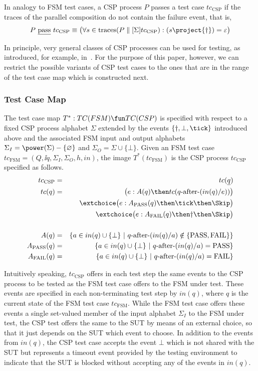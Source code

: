  In analogy to FSM test cases, a CSP process $P$ passes a test case $tc_\text{CSP}$
 if the traces of the parallel composition do not contain the failure event, that is,
 $$
 P\ \pass\ tc_\text{CSP} \equiv \big(
 \forall s\in\trc(P\parallel[\Sigma] tc_\text{CSP}): (s\project \{\dag\}) = \varepsilon
 \big)
 $$


 In principle, very general classes of CSP processes can be
 used for testing, as introduced, for example,
 in~\cite{DBLP:conf/fm/PeleskaS96,peleska1997a}. For the purpose of this paper, however, we can restrict the possible variants of CSP test cases to the ones that are in the range of the test case map which is constructed next.


\subsubsection*{Test Case Map}

The test case map $T^* :TC(FSM) \fun TC(CSP)$ is specified with respect to a fixed
CSP process alphabet $\Sigma$ extended by the events $\{\dag,\bot,\tick \}$ introduced
above
and the associated FSM input and output alphabets
$\Sigma_I = \power(\Sigma)-\{\varnothing\}$ and $\Sigma_O=\Sigma\cup \{\bot \}$.
Given an FSM test case $tc_\text{FSM}=(Q,\ii q,\Sigma_I,\Sigma_O,h,in)$,
the image $T^*(tc_\text{FSM})$ is the CSP process $tc_\text{CSP}$ specified
as follows.
\begin{eqnarray*}
tc_\text{CSP} & = & tc(\ii q)
\\
tc(q) & = & \big( e :  A(q) \then  tc(q\after (in(q)/e)) \big)
\\ & & \extchoice
 \big( e : A_\text{PASS}(q)   \then \tick \then \Skip \big)
\\ & & \extchoice
 \big( e : A_\text{FAIL}(q) \then \dag \then \Skip \big)
\\ & &
\\
A(q) & = & \{ a\in in(q)\cup\{\bot\}~|~q\after (in(q)/a)\notin \{\text{PASS},\text{FAIL}\} \}
\\
A_\text{PASS}(q) & = & \{ a\in in(q)\cup\{\bot\}~|~q\after(in(q)/a) = \text{PASS} \}
\\
A_\text{FAIL}(q) & = & \{ a\in in(q)\cup\{\bot\}~|~q\after(in(q)/a) = \text{FAIL} \}
\end{eqnarray*}

Intuitively speaking, $tc_\text{CSP}$ offers in each test step the same events to
the CSP process to be tested as the FSM test case offers to the FSM under test.
These events are specified in each non-terminating test step by $in(q)$, where
$q$ is the current state of the FSM test case $tc_\text{FSM}$. While the FSM test
case offers these events a single set-valued member of the input alphabet $\Sigma_I$
to the FSM under test, the CSP test offers the same to the SUT by means of an external choice, so that it just depends on the SUT which event to choose. In addition to the
events from $in(q)$, the CSP test case
accepts the event $\bot$ which is not shared with
the SUT but represents a timeout event provided by the testing environment to indicate
that the SUT is blocked without accepting any of the events in $in(q)$.

